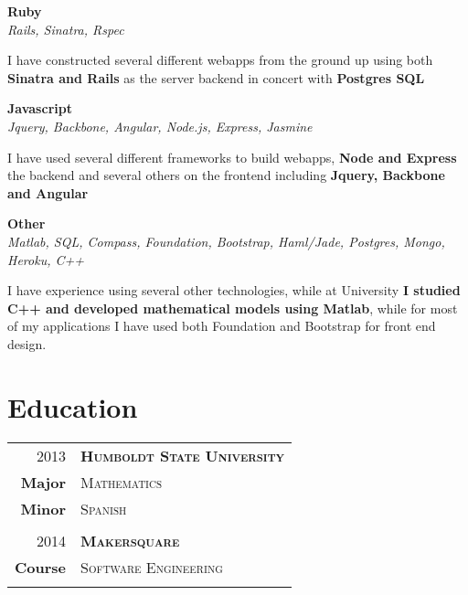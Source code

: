 \documentclass[10pt]{article} %
\begin{document}
{\begin{minipage}[t]{0.44\textwidth}
{\raggedright\large \textbf{Ruby}\\
\textit{Rails, Sinatra, Rspec }\\[5pt]}
\normalsize{I have constructed several different webapps from the ground up using both \textbf{Sinatra and Rails} as the server backend in concert with \textbf{Postgres SQL}}\\

{\raggedright\large \textbf{Javascript}\\
\textit{Jquery, Backbone, Angular, Node.js, Express, Jasmine}\\[5pt]}
\normalsize{I have used several different frameworks to build webapps,\textbf{ Node and Express} the backend and several others on the frontend including \textbf{Jquery, Backbone and Angular}}\\

{\raggedright\large \textbf{Other}\\
\textit{Matlab, SQL, Compass,  Foundation, Bootstrap, Haml/Jade, Postgres, Mongo, Heroku, C++}\\[5pt]}
\normalsize{I have experience using several other technologies, while at University \textbf{I studied C++ and developed mathematical models using Matlab}, while for most of my applications I have used both Foundation and Bootstrap for front end design.}\\







\section{Education}

\begin{tabular}{rl} %


 2013&\textbf{\textsc{Humboldt State University}}\\
\textbf{Major}& \textsc{Mathematics} \\
\textbf{Minor}& \textsc{Spanish}\\\\
 2014&\textbf{\textsc{Makersquare}}\\
\textbf{Course}& \textsc{Software Engineering} \\ \\




\end{tabular}
\end{minipage}}
\end{document}
